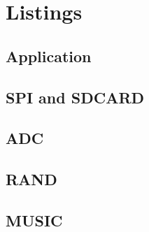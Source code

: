 \section{Listings}
\small{

\subsection{Application}





\subsection{SPI and SDCARD}




\subsection{ADC}




\subsection{RAND}




\subsection{MUSIC}

}

